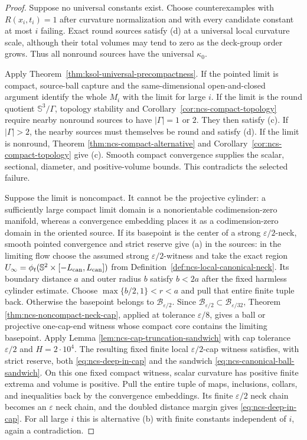 \documentclass[10pt]{coll-l}
\newcommand{\Sph}{\mathbb{S}}
\theoremstyle{definition}
\theoremstyle{remark}
\numberwithin{section}{chapter}
\numberwithin{equation}{chapter}
\begin{document}
\begin{proof}
Suppose no universal constants exist.  Choose counterexamples with
$R(x_i,t_i)=1$ after curvature normalization and with every candidate
constant at most $i$ failing.  Exact round sources satisfy (d) at a
universal local curvature scale, although their total volumes may tend to
zero as the deck-group order grows.  Thus all nonround sources have the
universal $\kappa_0$.

Apply Theorem~\ref{thm:ksol-universal-precompactness}.  If the pointed limit
is compact, source-ball capture and the same-dimensional open-and-closed
argument identify the whole $M_i$ with the limit for large $i$.  If the
limit is the round quotient $\Sph^3/\Gamma$, topology stability and
Corollary~\ref{cor:ncs-compact-topology} require nearby nonround sources to
have $|\Gamma|=1$ or $2$.  They then satisfy (c).  If $|\Gamma|>2$, the
nearby sources must themselves be round and satisfy (d).  If the limit is
nonround, Theorem
\ref{thm:ncs-compact-alternative} and
Corollary~\ref{cor:ncs-compact-topology} give (c).  Smooth compact
convergence supplies the scalar, sectional, diameter, and positive-volume
bounds.  This contradicts the selected failure.

Suppose the limit is noncompact.  It cannot be the projective cylinder: a
sufficiently large compact limit domain is a nonorientable
codimension-zero manifold, whereas a convergence embedding places it as a
codimension-zero domain in the oriented source.  If its basepoint is the
center of a strong $\varepsilon/2$-neck, smooth pointed convergence and
strict reserve give (a) in the sources: in the limiting flow choose the
assumed strong $\varepsilon/2$-witness and take the exact region
$U_\infty=\phi_t(\Sph^2\times[-L_{\rm can},L_{\rm can}])$ from
Definition~\ref{def:ncs-local-canonical-neck}.  Its boundary distance $a$
and outer radius $b$ satisfy $b<2a$ after the fixed harmless cylinder
estimate.  Choose $\max\{b/2,1\}<r<a$ and pull that entire finite tuple
back.
Otherwise the basepoint belongs to
$\mathscr B_{\varepsilon/2}$.  Since
$\mathscr B_{\varepsilon/2}\subset\mathscr B_{\varepsilon/32}$, Theorem
\ref{thm:ncs-noncompact-neck-cap}, applied at tolerance
$\varepsilon/8$, gives a ball or projective one-cap-end witness whose
compact core contains the limiting basepoint.  Apply Lemma
\ref{lem:ncs-cap-truncation-sandwich} with cap tolerance
$\varepsilon/2$ and $H=2\cdot10^4$.  The resulting fixed finite local
$\varepsilon/2$-cap witness satisfies, with strict reserve, both
\eqref{eq:ncs-deep-in-cap} and the sandwich
\eqref{eq:ncs-canonical-ball-sandwich}.  On this one fixed compact witness,
scalar curvature has positive finite extrema and volume is positive.
Pull the entire tuple of maps, inclusions, collars, and inequalities back by
the convergence embeddings.  Its finite $\varepsilon/2$ neck chain becomes
an $\varepsilon$ neck chain, and the doubled distance margin gives
\eqref{eq:ncs-deep-in-cap}.  For all large $i$ this is alternative (b)
with finite constants independent of $i$, again a contradiction.


\end{proof}
\end{document}
